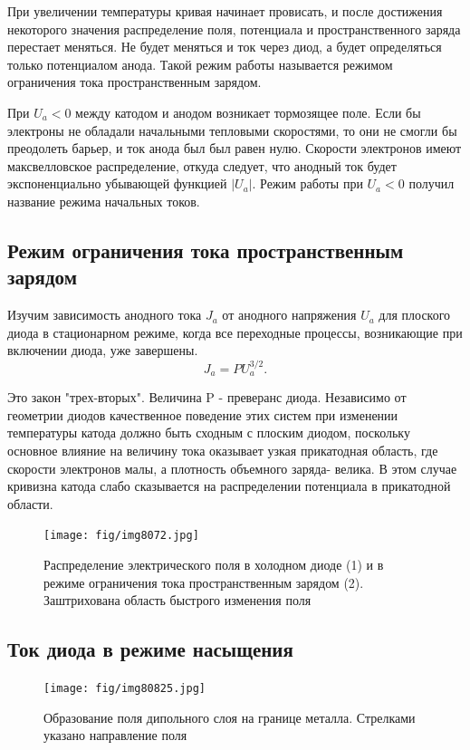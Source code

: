 При увеличении температуры кривая начинает провисать, и после достижения некоторого значения распределение поля, потенциала и пространственного заряда перестает меняться. Не будет меняться и ток через диод, а будет определяться только потенциалом анода. Такой режим работы называется режимом ограничения тока пространственным зарядом. 

При $U_a<0$ между катодом и анодом возникает тормозящее поле. Если бы электроны не обладали начальными тепловыми скоростями, то они не смогли бы преодолеть барьер, и ток анода был был равен нулю. Скорости электронов имеют максвелловское распределение, откуда следует, что анодный ток будет экспоненциально убывающей функцией $|U_a|$. Режим работы при $U_a<0$ получил название режима начальных токов.

\subsection{Режим ограничения тока пространственным зарядом}
Изучим зависимость анодного тока $J_a$ от анодного напряжения $U_a$ для плоского диода в стационарном режиме, когда все переходные процессы, возникающие при включении диода, уже завершены. 
\begin{equation}
    J_a=PU_a^{3/2}.
\end{equation}

Это закон "трех-вторых". Величина P - преверанс диода. Независимо от геометрии  диодов качественное поведение этих систем при изменении температуры катода должно быть сходным с плоским диодом, поскольку основное влияние на величину тока оказывает узкая прикатодная область, где скорости электронов малы, а плотность объемного заряда- велика. В этом случае кривизна катода слабо сказывается на распределении потенциала в прикатодной области.

\begin{figure}[h!]
    \centering
    \texttt{[image: fig/img8072.jpg]}
    \caption{Распределение электрического поля в холодном диоде (1) и в режиме ограничения тока пространственным зарядом (2). Заштрихована область быстрого изменения поля}
    \label{fig:4}
\end{figure}

\subsection{Ток диода в режиме насыщения}

\begin{figure}[h!]
    \centering
    \texttt{[image: fig/img80825.jpg]}
    \caption{Образование поля дипольного слоя на границе металла. Стрелками указано направление поля}
    \label{fig:5}
\end{figure}

